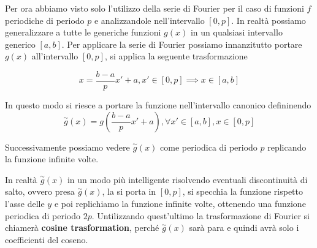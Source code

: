 Per ora abbiamo visto solo l'utilizzo della serie di Fourier per il caso di funzioni 
$f$ periodiche di periodo $p$ e analizzandole nell'intervallo $[0,p]$. In realtà 
possiamo generalizzare a tutte le generiche funzioni $g(x)$ in un qualsiasi intervallo 
generico $[a,b]$. Per applicare la serie di Fourier possiamo innanzitutto 
portare $g(x)$ all'intervallo $[0,p]$, si applica la seguente trasformazione

$$x=\frac{b-a}{p}x' + a, x'\in [0,p] \implies x\in [a,b]$$

In questo modo si riesce a portare la funzione nell'intervallo canonico defininendo
$$\stackrel{\sim}{g}(x) = g(\frac{b-a}{p}x'+a), \forall  x'\in [a,b], x\in [0,p]$$

Successivamente possiamo vedere $\stackrel{\sim}{g}(x)$ come periodica di periodo 
$p$ replicando la funzione infinite volte.

In realtà $\stackrel{\sim}{g}(x)$ in un modo più intelligente risolvendo eventuali 
discontinuità di salto, ovvero presa $\stackrel{\sim}{g}(x)$, la si porta in $[0,p]$,
si specchia la funzione rispetto l'asse delle $y$ e poi replichiamo la funzione 
infinite volte, ottenendo una funzione periodica di periodo $2p$.
Untilizzando quest'ultimo la trasformazione di Fourier si chiamerà \textbf{cosine trasformation},
perché $\stackrel{\sim}{g}(x)$ sarà para e quindi avrà solo i coefficienti del coseno.